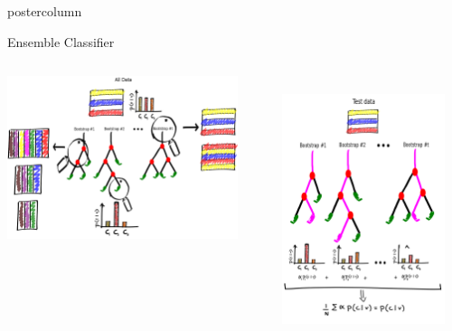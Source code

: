 \documentclass[final]{beamer}
\begin{document}
\begin{frame}
\begin{columns}
\begin{column}{.49\textwidth}
\begin{beamercolorbox}[center,wd=\textwidth]{postercolumn}
\begin{minipage}[T]{.95\textwidth}
{\begin{block}{Ensemble Classifier}
\begin{itemize}
\begin{columns}
\begin{column}{.54\textwidth}
            			\includegraphics[width = 0.9\textwidth, height = 0.15\textheight]{images/framework/RF_train.png}
            		\end{column}
            		\begin{column}{.44\textwidth}
            		\\
            			\includegraphics[width = 0.9\textwidth, height = 0.15\textheight]{images/framework/RF_test.png}

\end{column}
\end{columns}
\end{itemize}
\end{block}}
\end{minipage}
\end{beamercolorbox}
\end{column}
\end{columns}
\end{frame}
\end{document}
